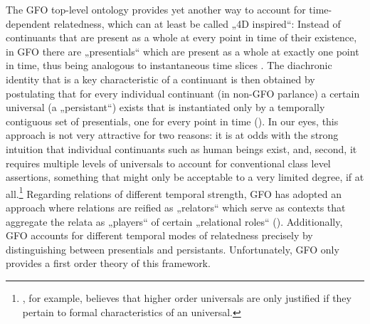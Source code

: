 \documentclass{ao2e}
\begin{document}
The GFO top-level ontology provides yet another way to account for
time-dependent relatedness, which can at least be called „4D inspired“:
Instead of continuants that are present as a whole at every point in time
of their existence, in GFO there are „presentials“ which are present as a whole at
exactly one point in time, thus being analogous to instantaneous time slices
. The diachronic
identity that is a key characteristic of a continuant is then obtained by
postulating that for every individual continuant (in non-GFO parlance) a certain
universal (a „persistant“) exists that is instantiated only by a temporally
contiguous set of presentials, one for every point in time (\cite{GFO:ref}). In our eyes,
this approach is not very attractive for two reasons: it is at odds with the
strong intuition that individual continuants such as human beings exist, and,
second, it requires multiple levels of universals to account for conventional
class level assertions, something that might only be acceptable to a very
limited degree, if at all.\footnote{\cite{Armstrong:USR}, for example, believes that
higher order universals are only justified if they pertain to formal
characteristics of an universal.}
Regarding relations of different temporal strength, GFO has adopted an approach
where relations are reified as „relators“ which serve as contexts that aggregate
the relata as „players“ of certain „relational roles“ (\cite{Loebe:2007}). Additionally, GFO
accounts for different temporal modes of relatedness precisely by distinguishing
between presentials and persistants. Unfortunately, GFO only provides a first
order theory of this framework.
\end{document}
